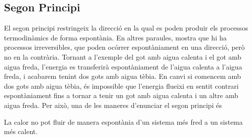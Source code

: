 \documentclass[12pt]{book}
\begin{document}
\subsection{Segon Principi}

El segon principi restringeix la direcció en la qual es poden produir els processos termodinàmics de forma espontània. En altres paraules, mostra que hi ha processos irreversibles, que poden ocórrer espontàniament en una direcció, però no en la contrària. Tornant a l'exemple del got amb aigua calenta i el got amb aigua freda, l'energia es transferirà espontàniament de l'aigua calenta a l'aigua freda, i acabarem tenint dos gots amb aigua tèbia. En canvi si comencem amb dos gots amb aigua tèbia, és impossible que l'energia flueixi en sentit contrari espontàniament fins a tornar a tenir un got amb aigua calenta i un altre amb aigua freda. Per això, una de les maneres d'enunciar el segon principi és

\begin{mdframed}
\begin{it}
    La calor no pot fluir de manera espontània d’un sistema més fred a un sistema més calent.
\end{it}
\end{mdframed}
\end{document}
